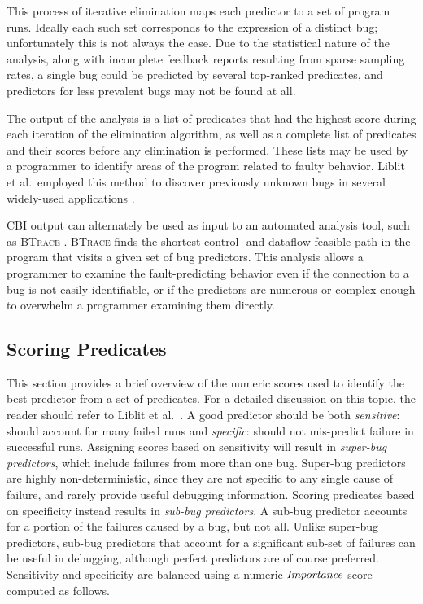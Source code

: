 This process of iterative elimination maps each predictor to a set of program runs.  Ideally each such set corresponds to the expression of a distinct bug; unfortunately this is not always the case.  Due to the statistical nature of the analysis, along with incomplete feedback reports resulting from sparse sampling rates, a single bug could be predicted by several top-ranked predicates, and predictors for less prevalent bugs may not be found at all.

The output of the analysis is a list of predicates that had the highest score during each iteration of the elimination algorithm, as well as a complete list of predicates and their scores before any elimination is performed.  These lists may be used by a programmer to identify areas of the program related to faulty behavior.  Liblit et al.\ employed this method to discover previously unknown bugs in several widely-used applications \cite{Liblit:2003:BIRPS,Liblit:2005:SSBI}.

CBI output can alternately be used as input to an automated analysis tool, such as \textsc{BTrace} \cite{Lal:2006:POPAD}. \textsc{BTrace} finds the shortest control- and dataflow-feasible path in the program that visits a given set of bug predictors.  This analysis allows a programmer to examine the fault-predicting behavior even if the connection to a bug is not easily identifiable, or if the predictors are numerous or complex enough to overwhelm a programmer examining them directly.

\subsection{Scoring Predicates}
\label{sec-scoring}
This section provides a brief overview of the numeric scores used to identify the best predictor from a set of predicates.  For a detailed discussion on this topic, the reader should refer to Liblit et al.\ \cite{Liblit:2005:SSBI}.  A good predictor should be both \emph{sensitive}: should account for many failed runs and \emph{specific}: should not mis-predict failure in successful runs.  Assigning scores based on sensitivity will result in \emph{super-bug predictors}, which include failures from more than one bug.  Super-bug predictors are highly non-deterministic, since they are not specific to any single cause of failure, and rarely provide useful debugging information.  Scoring predicates based on specificity instead results in \emph{sub-bug predictors}.  A sub-bug predictor accounts for a portion of the failures caused by a bug, but not all.  Unlike super-bug predictors, sub-bug predictors that account for a significant sub-set of failures can be useful in debugging, although perfect predictors are of course preferred.  Sensitivity and specificity are balanced using a numeric $\mathit{Importance}$ score computed as follows.


